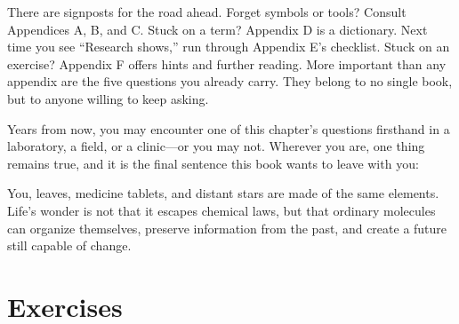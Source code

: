 There are signposts for the road ahead. Forget symbols or tools? Consult Appendices A, B, and C. Stuck on a term? Appendix D is a dictionary. Next time you see ``Research shows,'' run through Appendix E's checklist. Stuck on an exercise? Appendix F offers hints and further reading. More important than any appendix are the five questions you already carry. They belong to no single book, but to anyone willing to keep asking.

Years from now, you may encounter one of this chapter's questions firsthand in a laboratory, a field, or a clinic---or you may not. Wherever you are, one thing remains true, and it is the final sentence this book wants to leave with you:

You, leaves, medicine tablets, and distant stars are made of the same elements. Life's wonder is not that it escapes chemical laws, but that ordinary molecules can organize themselves, preserve information from the past, and create a future still capable of change.

\section*{Exercises}

